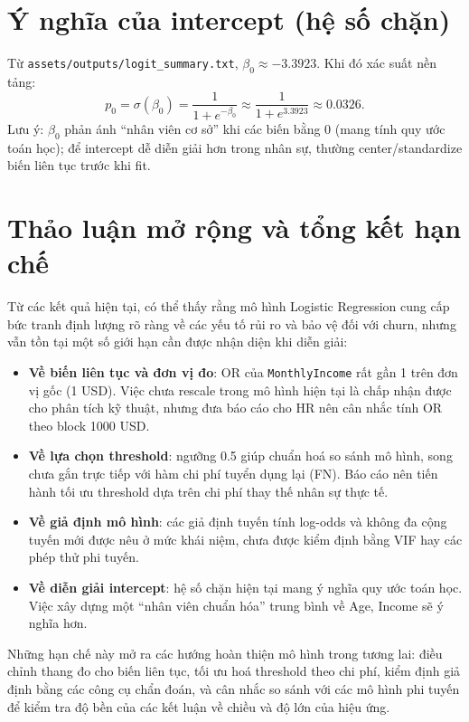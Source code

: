 \section{Ý nghĩa của intercept (hệ số chặn)}
Từ \texttt{assets/outputs/logit\_summary.txt}, \(\beta_0 \approx -3.3923\). Khi đó xác suất nền tảng:
\[
p_0=\sigma(\beta_0)=\frac{1}{1+e^{-\beta_0}} \approx \frac{1}{1+e^{3.3923}} \approx 0.0326.
\]
Lưu ý: \(\beta_0\) phản ánh ``nhân viên cơ sở'' khi các biến bằng 0 (mang tính quy ước toán học); để intercept dễ diễn giải hơn trong nhân sự, thường center/standardize biến liên tục trước khi fit.

\section{Thảo luận mở rộng và tổng kết hạn chế}
Từ các kết quả hiện tại, có thể thấy rằng mô hình Logistic Regression cung cấp bức tranh định lượng rõ ràng về các yếu tố rủi ro và bảo vệ đối với churn, nhưng vẫn tồn tại một số giới hạn cần được nhận diện khi diễn giải:
\begin{itemize}
  \item \textbf{Về biến liên tục và đơn vị đo}: OR của \texttt{MonthlyIncome} rất gần 1 trên đơn vị gốc (1 USD). Việc chưa rescale trong mô hình hiện tại là chấp nhận được cho phân tích kỹ thuật, nhưng đưa báo cáo cho HR nên cân nhắc tính OR theo block 1000 USD.
  \item \textbf{Về lựa chọn threshold}: ngưỡng 0.5 giúp chuẩn hoá so sánh mô hình, song chưa gắn trực tiếp với hàm chi phí tuyển dụng lại (FN). Báo cáo nên tiến hành tối ưu threshold dựa trên chi phí thay thế nhân sự thực tế.
  \item \textbf{Về giả định mô hình}: các giả định tuyến tính log-odds và không đa cộng tuyến mới được nêu ở mức khái niệm, chưa được kiểm định bằng VIF hay các phép thử phi tuyến.
  \item \textbf{Về diễn giải intercept}: hệ số chặn hiện tại mang ý nghĩa quy ước toán học. Việc xây dựng một ``nhân viên chuẩn hóa'' trung bình về Age, Income sẽ ý nghĩa hơn.
\end{itemize}
Những hạn chế này mở ra các hướng hoàn thiện mô hình trong tương lai: điều chỉnh thang đo cho biến liên tục, tối ưu hoá threshold theo chi phí, kiểm định giả định bằng các công cụ chẩn đoán, và cân nhắc so sánh với các mô hình phi tuyến để kiểm tra độ bền của các kết luận về chiều và độ lớn của hiệu ứng.
